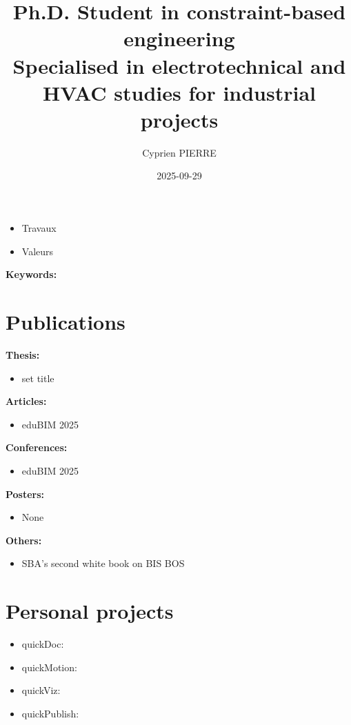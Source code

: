 \documentclass[a4paper,12pt]{article}
\author{Cyprien PIERRE}
\date{2025-09-29}
\title{Ph.D. Student in constraint-based engineering\\\medskip
\large Specialised in electrotechnical and HVAC studies for industrial projects}
\begin{document}
\maketitle
\begin{ABSTRACT}
\begin{itemize}
\item Travaux
\item Valeurs
\end{itemize}
\end{ABSTRACT}


\textbf{Keywords: }
\section{Publications}
\label{sec:org2741494}
\textbf{Thesis:}
\begin{itemize}
\item set title
\end{itemize}
\textbf{Articles:}
\begin{itemize}
\item eduBIM 2025
\end{itemize}
\textbf{Conferences:}
\begin{itemize}
\item eduBIM 2025
\end{itemize}
\textbf{Posters:}
\begin{itemize}
\item None
\end{itemize}
\textbf{Others:}
\begin{itemize}
\item SBA's second white book on BIS BOS
\end{itemize}
\section{Personal projects}
\label{sec:org9b21dc2}
\begin{itemize}
\item quickDoc:
\item quickMotion:
\item quickViz:
\item quickPublish:
\end{itemize}
\end{document}
